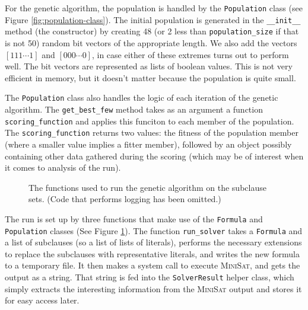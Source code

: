 \documentclass[proof,pdftex,11pt,a4]{article}
\def\code{\lstinline[basicstyle=\textsize\ttfamily]}
\begin{document}
For the genetic algorithm, the population is handled by the \code{Population} class (see Figure \ref{fig:population-class}). The initial population is generated in the \code{__init__} method (the constructor) by creating 48 (or 2 less than \code{population_size} if that is not 50) random bit vectors of the appropriate length. We also add the vectors $[111\cdots1]$ and $[000\cdots0]$, in case either of these extremes turns out to perform well. The bit vectors are represented as lists of boolean values. This is not very efficient in memory, but it doesn't matter because the population is quite small.

The \code{Population} class also handles the logic of each iteration of the genetic algorithm. The \code{get_best_few} method takes as an argument a function \code{scoring_function} and applies this funciton to each member of the population. The \code{scoring_function} returns two values: the fitness of the population member (where a smaller value implies a fitter member), followed by an object possibly containing other data gathered during the scoring (which may be of interest when it comes to analysis of the run).

\begin{figure}[h]
  
  \caption{The functions used to run the genetic algorithm on the subclause sets. (Code that performs logging has been omitted.)}
  \label{fig:run-functions}
\end{figure}

The run is set up by three functions that make use of the \code{Formula} and \code{Population} classes (See Figure \ref{fig:run-functions}). The function \code{run_solver} takes a \code{Formula} and a list of subclauses (so a list of lists of literals), performs the necessary extensions to replace the subclauses with representative literals, and writes the new formula to a temporary file. It then makes a system call to execute \textsc{MiniSat}, and gets the output as a string. That string is fed into the \code{SolverResult} helper class, which simply extracts the interesting information from the \textsc{MiniSat} output and stores it for easy access later.
\end{document}
